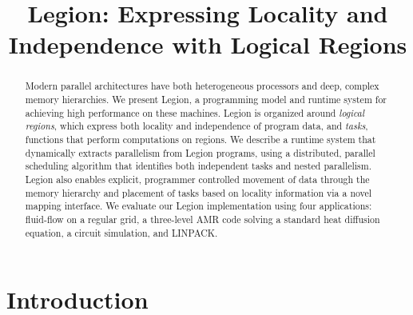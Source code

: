 \documentclass[conference]{IEEEtran}
\begin{document}
\pdfpagewidth=8.5in
\pdfpageheight=11in

\title{Legion: Expressing Locality and Independence with Logical Regions}
\author{
}

\maketitle


\begin{abstract}
Modern parallel architectures have both heterogeneous processors and
deep, complex memory hierarchies.  We present Legion, a programming
model and runtime system for achieving high performance on these
machines.  Legion is organized around {\em logical regions}, which
express both locality and independence of program data, and {\em
  tasks}, functions that perform computations on regions.  We describe
a runtime system that dynamically extracts parallelism from
Legion programs, using a distributed, parallel scheduling algorithm
that identifies both independent tasks and nested parallelism.  Legion
also enables explicit, programmer controlled movement of data through
the memory hierarchy and placement of tasks based on locality
information via a novel mapping interface.  We evaluate our Legion
implementation using four applications: fluid-flow on a regular grid,
a three-level AMR code solving a standard heat diffusion equation, a circuit simulation,
and LINPACK.
\end{abstract}

\section{Introduction}
\label{sect:intro}
\end{document}
